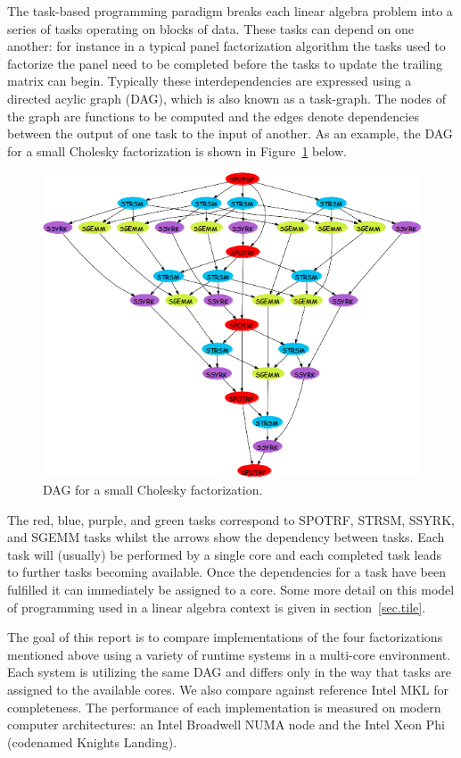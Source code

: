 \documentclass[a4paper,12pt]{article}
\begin{document}
The task-based programming paradigm breaks each linear algebra
problem into a series of tasks operating on blocks of data.
These tasks can depend on one another:
for instance in a typical panel factorization algorithm
the tasks used to factorize the panel need to be completed
before the tasks to update the trailing matrix can begin.
Typically these interdependencies are expressed using a
directed acylic graph (DAG),
which is also known as a task-graph.
The nodes of the graph are functions to be computed and
the edges denote dependencies between the output of one task
to the input of another.
As an example,
the DAG for a small Cholesky factorization is shown in
Figure~\ref{fig.chol_dag} below.
\begin{figure}[th]
  \centering
  \includegraphics[scale=.6]{fig/spotrf_dag.png}
  \caption{DAG for a small Cholesky factorization.}
  \label{fig.chol_dag}
\end{figure}

The red, blue, purple, and green tasks correspond to
SPOTRF, STRSM, SSYRK, and SGEMM tasks
whilst the arrows show the dependency between tasks.
Each task will (usually) be performed by a single core
and each completed task leads to further tasks becoming available.
Once the dependencies for a task have been fulfilled it
can immediately be assigned to a core.
Some more detail on this model of programming
used in a linear algebra context is given in section~\ref{sec.tile}.

The goal of this report is to compare implementations of
the four factorizations mentioned above
using a variety of runtime systems in a multi-core environment.
Each system is utilizing the same DAG and differs only in the way
that tasks are assigned to the available cores.
We also compare against reference Intel MKL
for completeness.
The performance of each implementation is measured
on modern computer architectures:
an Intel Broadwell NUMA node
and the Intel Xeon Phi (codenamed Knights Landing).
\end{document}
